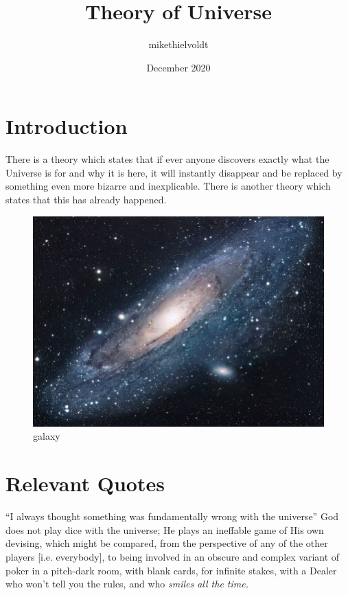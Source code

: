 \documentclass{article}
\title{Theory of Universe}
\author{mikethielvoldt }
\date{December 2020}
\begin{document}
\maketitle

\section{Introduction}
There is a theory which states that if ever anyone discovers exactly what the Universe is for and why it is here, it will instantly disappear and be replaced by something even more bizarre and inexplicable.
There is another theory which states that this has already happened.



\begin{figure}[h!]
\centering
\includegraphics[scale=1.7]{galaxy}
\caption{galaxy}
\label{fig:galaxy}
\end{figure}

\section{Relevant Quotes}
``I always thought something was fundamentally wrong with the universe'' \citep{adams1995hitchhiker}\newline
\newline
God does not play dice with the universe; He plays an ineffable game of His own devising, which might be compared, from the perspective of any of the other players [i.e. everybody], to being involved in an obscure and complex variant of poker in a pitch-dark room, with blank cards, for infinite stakes, with a Dealer who won't tell you the rules, and who \em{smiles all the time}.



\end{document}
